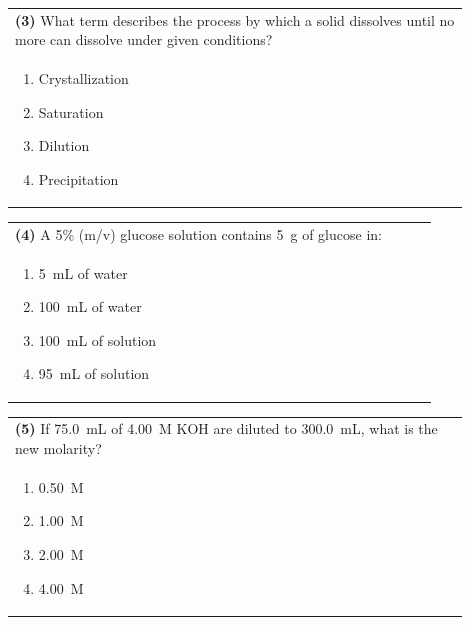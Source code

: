 \documentclass{article}
\begin{document}
\noindent\begin{tabular}{|p{0.9\linewidth}|}
\hline
\textbf{(3)} What term describes the process by which a solid dissolves until no more can dissolve under given conditions?\\[0.2cm]
\begin{minipage}[t]{0.85\linewidth}
\begin{enumerate}[label=\alph*.]
\item Crystallization
\item Saturation
\item Dilution
\item Precipitation
\end{enumerate}
\end{minipage}\\[0.2cm]
\hline
\end{tabular}

\noindent\begin{tabular}{|p{0.9\linewidth}|}
\hline
\textbf{(4)} A 5\% (m/v) glucose solution contains 5~g of glucose in:\\[0.2cm]
\begin{minipage}[t]{0.85\linewidth}
\begin{enumerate}[label=\alph*.]
\item 5~mL of water
\item 100~mL of water
\item 100~mL of solution
\item 95~mL of solution
\end{enumerate}
\end{minipage}\\[0.2cm]
\hline
\end{tabular}
\newpage

\noindent\begin{tabular}{|p{0.9\linewidth}|}
\hline
\textbf{(5)} If 75.0~mL of 4.00~M KOH are diluted to 300.0~mL, what is the new molarity?\\[0.2cm]
\begin{minipage}[t]{0.85\linewidth}
\begin{enumerate}[label=\alph*.]
\item 0.50~M
\item 1.00~M
\item 2.00~M
\item 4.00~M
\end{enumerate}
\end{minipage}\\[0.2cm]
\hline
\end{tabular}
\end{document}
